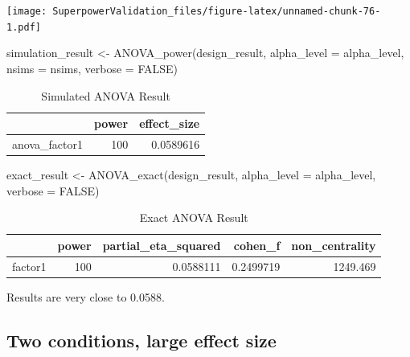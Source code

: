 \documentclass[
]{book}
\newenvironment{Shaded}{\begin{snugshade}}{\end{snugshade}}
\newcommand{\AttributeTok}[1]{\textcolor[rgb]{0.77,0.63,0.00}{#1}}
\newcommand{\ConstantTok}[1]{\textcolor[rgb]{0.00,0.00,0.00}{#1}}
\newcommand{\FunctionTok}[1]{\textcolor[rgb]{0.00,0.00,0.00}{#1}}
\newcommand{\NormalTok}[1]{#1}
\newcommand{\OtherTok}[1]{\textcolor[rgb]{0.56,0.35,0.01}{#1}}
\begin{document}
\texttt{[image: SuperpowerValidation\_files/figure-latex/unnamed-chunk-76-1.pdf]}

\begin{Shaded}
\begin{Highlighting}[]
\NormalTok{simulation\_result }\OtherTok{\textless{}{-}} \FunctionTok{ANOVA\_power}\NormalTok{(design\_result,}
                                 \AttributeTok{alpha\_level =}\NormalTok{ alpha\_level,}
                                 \AttributeTok{nsims =}\NormalTok{ nsims,}
                                 \AttributeTok{verbose =} \ConstantTok{FALSE}\NormalTok{)}
\end{Highlighting}
\end{Shaded}

\begin{table}[!h]

\caption{\label{tab:unnamed-chunk-78}Simulated ANOVA Result}
\centering
\begin{tabular}[t]{l|r|r}
\hline
  & power & effect\_size\\
\hline
anova\_factor1 & 100 & 0.0589616\\
\hline
\end{tabular}
\end{table}

\begin{Shaded}
\begin{Highlighting}[]
\NormalTok{exact\_result }\OtherTok{\textless{}{-}} \FunctionTok{ANOVA\_exact}\NormalTok{(design\_result,}
                            \AttributeTok{alpha\_level =}\NormalTok{ alpha\_level,}
                            \AttributeTok{verbose =} \ConstantTok{FALSE}\NormalTok{)}
\end{Highlighting}
\end{Shaded}

\begin{table}[!h]

\caption{\label{tab:unnamed-chunk-80}Exact ANOVA Result}
\centering
\begin{tabular}[t]{l|r|r|r|r}
\hline
  & power & partial\_eta\_squared & cohen\_f & non\_centrality\\
\hline
factor1 & 100 & 0.0588111 & 0.2499719 & 1249.469\\
\hline
\end{tabular}
\end{table}

Results are very close to 0.0588.

\hypertarget{two-conditions-large-effect-size}{%
\subsection{Two conditions, large effect size}\label{two-conditions-large-effect-size}}
\end{document}

